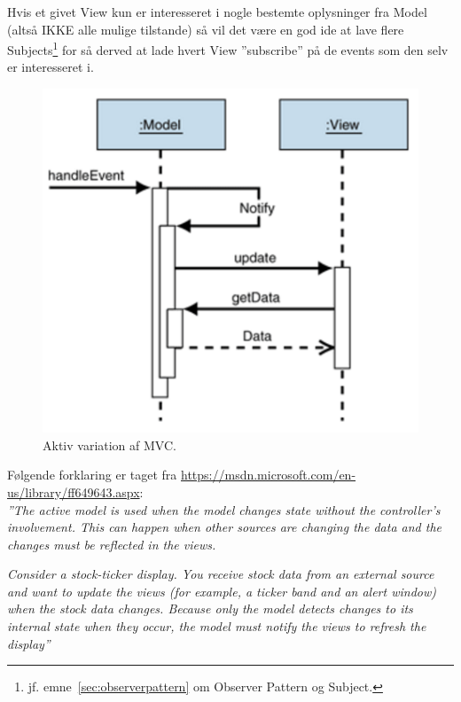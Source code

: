 Hvis et givet View kun er interesseret i nogle bestemte oplysninger fra Model (altså IKKE alle mulige tilstande) så vil det være en god ide at lave flere Subjects\footnote{jf. emne~\ref{sec:observerpattern} om Observer Pattern og Subject.} for så derved at lade hvert View ''subscribe'' på de events som den selv er interesseret i.

\begin{figure}[H]
	\centering
	\includegraphics[width=0.6\linewidth]{figs/MVC/mvc_active}
	\caption{Aktiv variation af MVC.}
	\label{fig:mvc_active}
\end{figure}

Følgende forklaring er taget fra \url{https://msdn.microsoft.com/en-us/library/ff649643.aspx}:\\

\textit{''The active model is used when the model changes state without the controller's involvement. This can happen when other sources are changing the data and the changes must be reflected in the views.}

\textit{Consider a stock-ticker display. You receive stock data from an external source and want to update the views (for example, a ticker band and an alert window) when the stock data changes. Because only the model detects changes to its internal state when they occur, the model must notify the views to refresh the display''}

